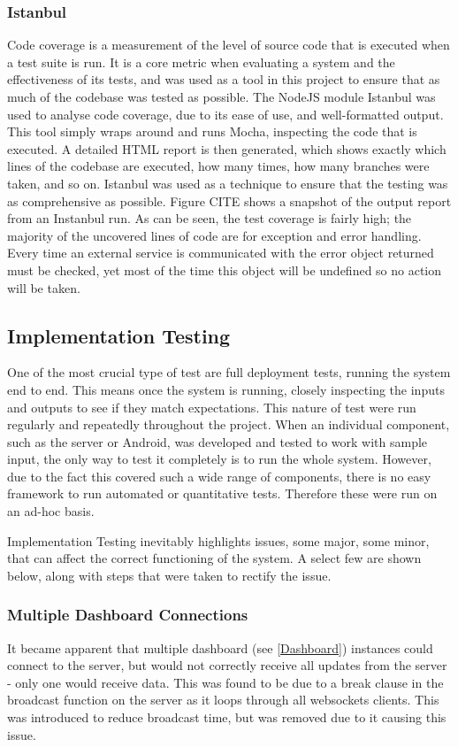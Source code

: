 \documentclass{article}
\begin{document}
\subsubsection{Istanbul}
Code coverage is a measurement of the level of source code that is executed when a test suite is run. It is a core metric when evaluating a system and the effectiveness of its tests, and was used as a tool in this project to ensure that as much of the codebase was tested as possible. The NodeJS module Istanbul was used to analyse code coverage, due to its ease of use, and well-formatted output\cite{istanbul}. This tool simply wraps around and runs Mocha, inspecting the code that is executed. A detailed HTML report is then generated, which shows exactly which lines of the codebase are executed, how many times, how many branches were taken, and so on. Istanbul was used as a technique to ensure that the testing was as comprehensive as possible. Figure CITE shows a snapshot of the output report from an Instanbul run. As can be seen, the test coverage is fairly high; the majority of the uncovered lines of code are for exception and error handling. Every time an external service is communicated with the error object returned must be checked, yet most of the time this object will be undefined so no action will be taken.

\subsection{Implementation Testing}\label{ImplementationTesting}
One of the most crucial type of test are full deployment tests, running the system end to end. This means once the system is running, closely inspecting the inputs and outputs to see if they match expectations. This nature of test were run regularly and repeatedly throughout the project. When an individual component, such as the server or Android, was developed and tested to work with sample input, the only way to test it completely is to run the whole system. However, due to the fact this covered such a wide range of components, there is no easy framework to run automated or quantitative tests. Therefore these were run on an ad-hoc basis.

Implementation Testing inevitably highlights issues, some major, some minor, that can affect the correct functioning of the system. A select few are shown below, along with steps that were taken to rectify the issue.

\subsubsection{Multiple Dashboard Connections}
It became apparent that multiple dashboard (see \ref{Dashboard}) instances could connect to the server, but would not correctly receive all updates from the server - only one would receive data. This was found to be due to a break clause in the broadcast function on the server as it loops through all websockets clients. This was introduced to reduce broadcast time, but was removed due to it causing this issue.
\end{document}
